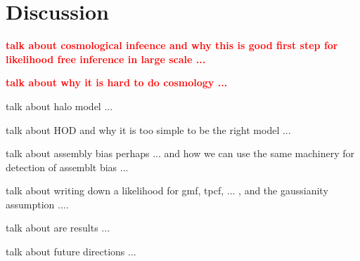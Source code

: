 \documentclass[12pt, preprint]{aastex}
\newcommand{\todo}[1]{{\bf \textcolor{red}{ #1}}}
\begin{document}
\section{Discussion}
\todo{talk about cosmological infeence and why this is good first step for likelihood free inference in large scale ...}

\todo{talk about why it is hard to do cosmology ...}

talk about halo model ...

talk about HOD and why it is too simple to be the right model ...

talk about assembly bias perhaps ... and how we can use the same machinery for detection of assemblt bias ... 

talk about writing down a likelihood for gmf, tpcf, ... , and the gaussianity assumption ....

talk about are results ...


talk about future directions ...


\end{document}
